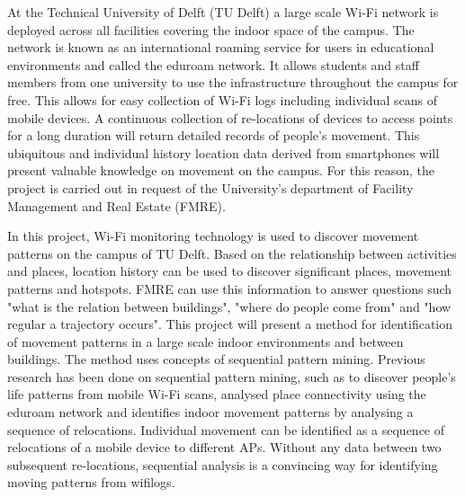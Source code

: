 At the Technical University of Delft (TU Delft) a large scale Wi-Fi network is deployed across all facilities covering the indoor space of the campus. The network is known as an international roaming service for users in educational environments and called the eduroam network. It allows students and staff members from one university to use the infrastructure throughout the campus for free. This allows for easy collection of Wi-Fi logs including individual scans of mobile devices.  A continuous collection of re-locations of devices to access points for a long duration will return detailed records of people’s movement. This ubiquitous and individual history location data derived from smartphones will present valuable knowledge on movement on the campus. For this reason, the project is carried out in request of the University’s department of Facility Management and Real Estate (FMRE). 

In this project, Wi-Fi monitoring technology is used to discover movement
patterns on the campus of TU Delft. Based on the relationship between activities and places, location history can be used to discover significant places, movement patterns and hotspots. FMRE can use this information to answer questions such "what is the relation between buildings", "where do people come from" and "how regular a trajectory occurs". This project will present a method for identification of movement patterns in a large scale indoor environments and between buildings. The method uses concepts of sequential pattern mining. Previous research has been done on sequential pattern mining, such as \cite{zhao2014discovering} to discover people’s life patterns from mobile Wi-Fi scans, \citep{meneses2012large} analysed place connectivity using the eduroam network and \cite{radaelli2013identifying} identifies indoor movement patterns by analysing a sequence of relocations. Individual movement can be identified as a sequence of relocations of a mobile device to different APs. Without any data between two subsequent re-locations, sequential analysis is a convincing way for identifying moving patterns from wifilogs.

